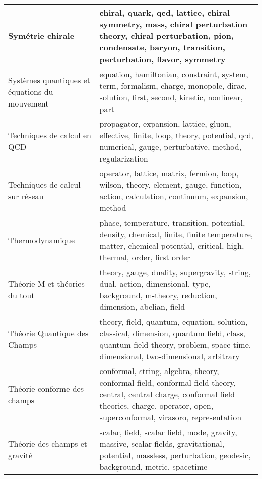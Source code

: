 \begin{longtable}[H]{p{}|p{}}
Symétrie chirale                                                &                                  chiral, quark, qcd, lattice, chiral symmetry, mass, chiral perturbation theory, chiral perturbation, pion, condensate, baryon, transition, perturbation, flavor, symmetry \\ \midrule
Systèmes quantiques et équations du mouvement                   &                                                                     equation, hamiltonian, constraint, system, term, formalism, charge, monopole, dirac, solution, first, second, kinetic, nonlinear, part \\ \midrule
Techniques de calcul en QCD                                     &                                                             propagator, expansion, lattice, gluon, effective, finite, loop, theory, potential, qcd, numerical, gauge, perturbative, method, regularization \\ \midrule
Techniques de calcul sur réseau                                 &                                                                      operator, lattice, matrix, fermion, loop, wilson, theory, element, gauge, function, action, calculation, continuum, expansion, method \\ \midrule
Thermodynamique                                                 &                                          phase, temperature, transition, potential, density, chemical, finite, finite temperature, matter, chemical potential, critical, high, thermal, order, first order \\ \midrule
Théorie M et théories du tout                                   &                                                                  theory, gauge, duality, supergravity, string, dual, action, dimensional, type, background, m-theory, reduction, dimension, abelian, field \\ \midrule
Théorie Quantique des Champs                                    &                                 theory, field, quantum, equation, solution, classical, dimension, quantum field, class, quantum field theory, problem, space-time, dimensional, two-dimensional, arbitrary \\ \midrule
Théorie conforme des champs                                     &           conformal, string, algebra, theory, conformal field, conformal field theory, central, central charge, conformal field theories, charge, operator, open, superconformal, virasoro, representation \\ \midrule
Théorie des champs et gravité                                   &                                              scalar, field, scalar field, mode, gravity, massive, scalar fields, gravitational, potential, massless, perturbation, geodesic, background, metric, spacetime \\ \midrule

\end{longtable}

